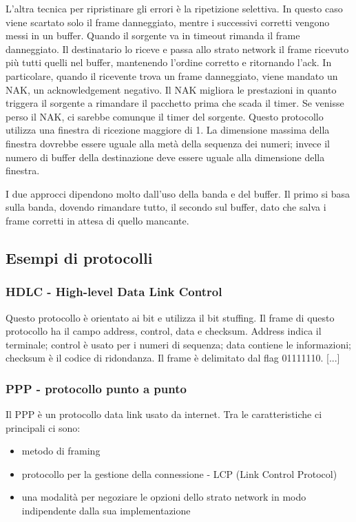 L'altra tecnica per ripristinare gli errori è la ripetizione selettiva.
In questo caso viene scartato solo il frame danneggiato, mentre i successivi corretti vengono messi in un buffer.
Quando il sorgente va in timeout rimanda il frame danneggiato.
Il destinatario lo riceve e passa allo strato network il frame ricevuto più tutti quelli nel buffer, mantenendo l'ordine corretto e ritornando l'ack.
In particolare, quando il ricevente trova un frame danneggiato, viene mandato un NAK, un acknowledgement negativo.
Il NAK migliora le prestazioni in quanto triggera il sorgente a rimandare il pacchetto prima che scada il timer.
Se venisse perso il NAK, ci sarebbe comunque il timer del sorgente.
Questo protocollo utilizza una finestra di ricezione maggiore di 1.
La dimensione massima della finestra dovrebbe essere uguale alla metà della sequenza dei numeri;
invece il numero di buffer della destinazione deve essere uguale alla dimensione della finestra.

I due approcci dipendono molto dall'uso della banda e del buffer. 
Il primo si basa sulla banda, dovendo rimandare tutto, il secondo sul buffer, dato che salva i frame corretti in attesa di quello mancante.

\subsection{Esempi di protocolli} %

\subsubsection{HDLC - High-level Data Link Control}
Questo protocollo è orientato ai bit e utilizza il bit stuffing.
Il frame di questo protocollo ha il campo address, control, data e checksum.
Address indica il terminale; control è usato per i numeri di sequenza; 
data contiene le informazioni; checksum è il codice di ridondanza.
Il frame è delimitato dal flag 01111110.
[...]

\subsubsection{PPP - protocollo punto a punto}
Il PPP è un protocollo data link usato da internet.
Tra le caratteristiche ci principali ci sono:
\begin{itemize}
    \item metodo di framing
    \item protocollo per la gestione della connessione - LCP (Link Control Protocol)
    \item una modalità per negoziare le opzioni dello strato network in modo indipendente dalla sua implementazione
\end{itemize}

